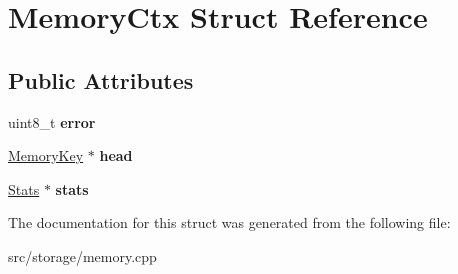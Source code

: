 \hypertarget{struct_memory_ctx}{}\section{Memory\+Ctx Struct Reference}
\label{struct_memory_ctx}
\subsection*{Public Attributes}
\begin{DoxyCompactItemize}
\item 
\hypertarget{struct_memory_ctx_a73340f3d3f2a85a235a7ff697369a59e}{}uint8\+\_\+t {\bfseries error}\label{struct_memory_ctx_a73340f3d3f2a85a235a7ff697369a59e}

\item 
\hypertarget{struct_memory_ctx_a3919435ed5d1230330b2e4d085510fd7}{}\hyperlink{struct_memory_key}{Memory\+Key} $\ast$ {\bfseries head}\label{struct_memory_ctx_a3919435ed5d1230330b2e4d085510fd7}

\item 
\hypertarget{struct_memory_ctx_a168100afeb2b0d3e83600c79262df4ae}{}\hyperlink{struct_stats}{Stats} $\ast$ {\bfseries stats}\label{struct_memory_ctx_a168100afeb2b0d3e83600c79262df4ae}

\end{DoxyCompactItemize}


The documentation for this struct was generated from the following file\+:\begin{DoxyCompactItemize}
\item 
src/storage/memory.\+cpp\end{DoxyCompactItemize}
